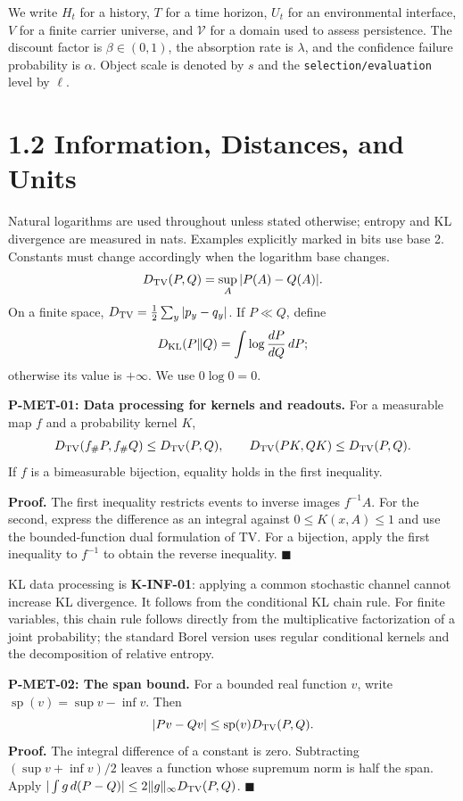 \documentclass[
  english,
  11pt,
  oneside]{book}
\begin{document}
We write \(H_t\) for a history, \(T\) for a time horizon, \(U_t\) for an environmental interface, \(V\) for a finite carrier universe, and \(\mathcal V\) for a domain used to assess persistence. The discount factor is \(\beta\in(0,1)\), the absorption rate is \(\lambda\), and the confidence failure probability is \(\alpha\). Object scale is denoted by \(s\) and the \nolinkurl{selection/evaluation} level by \(\ell\).

\section{1.2 Information, Distances, and Units}\label{information-distances-and-units}

Natural logarithms are used throughout unless stated otherwise; entropy and KL divergence are measured in nats. Examples explicitly marked in bits use base 2. Constants must change accordingly when the logarithm base changes. \[D_{\rm TV}(P,Q)=\sup_A|P(A)-Q(A)|.\] On a finite space, \(D_{\rm TV}=\frac12\sum_y|p_y-q_y|\). If \(P\ll Q\), define \[D_{\rm KL}(P\|Q)=\int\log\frac{dP}{dQ}\,dP;\] otherwise its value is \(+\infty\). We use \(0\log0=0\).

\hypertarget{p-met-01}{}\label{p-met-01}

\textbf{P-MET-01: Data processing for kernels and readouts.} For a measurable map \(f\) and a probability kernel \(K\), \[D_{\rm TV}(f_\#P,f_\#Q)\le D_{\rm TV}(P,Q),\qquad
D_{\rm TV}(PK,QK)\le D_{\rm TV}(P,Q).\] If \(f\) is a bimeasurable bijection, equality holds in the first inequality.

\textbf{Proof.} The first inequality restricts events to inverse images \(f^{-1}A\). For the second, express the difference as an integral against \(0\le K(x,A)\le1\) and use the bounded-function dual formulation of TV. For a bijection, apply the first inequality to \(f^{-1}\) to obtain the reverse inequality. \(\blacksquare\)

KL data processing is \textbf{K-INF-01}: applying a common stochastic channel cannot increase KL divergence. It follows from the conditional KL chain rule. For finite variables, this chain rule follows directly from the multiplicative factorization of a joint probability; the standard Borel version uses regular conditional kernels and the decomposition of relative entropy.

\hypertarget{p-met-02}{}\label{p-met-02}

\textbf{P-MET-02: The span bound.} For a bounded real function \(v\), write \(\operatorname{sp}(v)=\sup v-\inf v\). Then \[|Pv-Qv|\le\operatorname{sp}(v)D_{\rm TV}(P,Q).\] \textbf{Proof.} The integral difference of a constant is zero. Subtracting \((\sup v+\inf v)/2\) leaves a function whose supremum norm is half the span. Apply \(|\int g\,d(P-Q)|\le2\|g\|_\infty D_{\rm TV}(P,Q)\). \(\blacksquare\)
\end{document}
